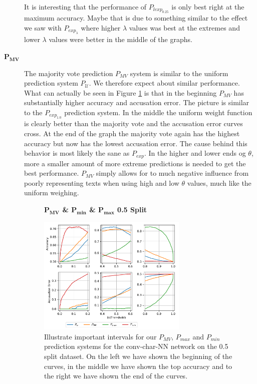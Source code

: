 \begin{description}
        It is interesting that the performance of $P_{lexp_{0.25}}$ is only best
        right at the maximum accuracy. Maybe that is due to something similar to
        the effect we saw with $P_{exp_{\lambda}}$ where higher $\lambda$ values
        was best at the extremes and lower $\lambda$ values were better in the
        middle of the graphs.

    \item[$\mathbf{P_{MV}}$]

        The majority vote prediction $P_{MV}$ system is similar to the
        uniform prediction system $P_{\mathcal{U}}$. We therefore expect
        about similar performance. What can actually be seen in Figure
        \ref{fig:conv_char_prediction_zoom_50_majority_vote} is that in the
        beginning $P_{MV}$ has substantially higher accuracy and accusation
        error. The picture is similar to the $P_{exp_{1.0}}$ prediction system.
        In the middle the uniform weight function is clearly better than the
        majority vote and the accusation error curves cross. At the end of the
        graph the majority vote again has the highest accuracy but now has the
        lowest accusation error. The cause behind this behavior is most likely
        the sane as $P_{exp}$. In the higher and lower ends og $\theta$, more
        a smaller amount of more extreme predictions is needed to get the best
        performance. $P_{MV}$ simply allows for to much negative influence from
        poorly representing texts when using high and low $\theta$ values, much
        like the uniform weighing.

        \begin{figure}
            \centering
            \textbf{$\mathbf{P_{MV}}$ \& $\mathbf{P_{min}}$ \&
            $\mathbf{P_{max}}$ 0.5 Split}\par\medskip
            \includegraphics[width=0.7\textwidth]{./pictures/discussion/conv_char_nn_prediction_zoom_min_max}
            \caption{Illustrate important intervals for our $P_{MV}$, $P_{max}$
                and $P_{min}$ prediction systems for the \gls{conv-char-NN}
                network on the 0.5 split dataset. On the left we have shown the
                beginning of the curves, in the middle we have shown the top
                accuracy and to the right we have shown the end of the curves.}
            \label{fig:conv_char_prediction_zoom_50_majority_vote}
        \end{figure}


\end{description}

